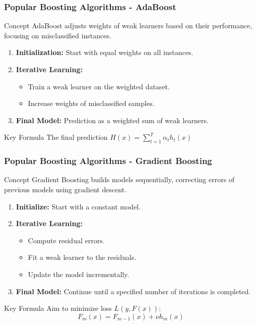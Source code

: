 \documentclass[aspectratio=169]{beamer}
\begin{document}
\begin{frame}[fragile]
    \frametitle{Popular Boosting Algorithms - AdaBoost}
    \begin{block}{Concept}
        AdaBoost adjusts weights of weak learners based on their performance, focusing on misclassified instances.
    \end{block}
    \begin{enumerate}
        \item \textbf{Initialization:} Start with equal weights on all instances.
        \item \textbf{Iterative Learning:}
        \begin{itemize}
            \item Train a weak learner on the weighted dataset.
            \item Increase weights of misclassified samples.
        \end{itemize}
        \item \textbf{Final Model:} Prediction as a weighted sum of weak learners.
    \end{enumerate}
    \begin{block}{Key Formula}
        The final prediction \( H(x) = \sum_{t=1}^{T} \alpha_t h_t(x) \)
    \end{block}
\end{frame}

\begin{frame}[fragile]
    \frametitle{Popular Boosting Algorithms - Gradient Boosting}
    \begin{block}{Concept}
        Gradient Boosting builds models sequentially, correcting errors of previous models using gradient descent.
    \end{block}
    \begin{enumerate}
        \item \textbf{Initialize:} Start with a constant model.
        \item \textbf{Iterative Learning:}
        \begin{itemize}
            \item Compute residual errors.
            \item Fit a weak learner to the residuals.
            \item Update the model incrementally.
        \end{itemize}
        \item \textbf{Final Model:} Continue until a specified number of iterations is completed.
    \end{enumerate}
    \begin{block}{Key Formula}
        Aim to minimize loss \( L(y, F(x)) \): 
        \[
        F_{m}(x) = F_{m-1}(x) + \nu h_m(x)
        \]
    \end{block}
\end{frame}
\end{document}

